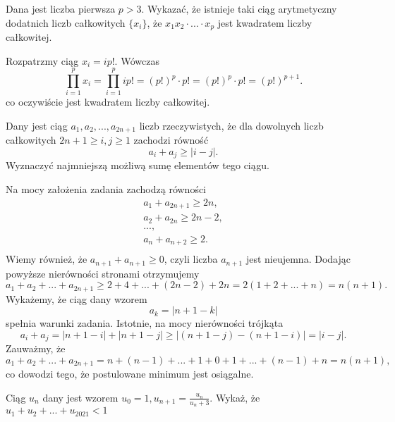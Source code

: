 \newpage
{}

\begin{problem}{1}
	Dana jest liczba pierwsza $p>3$. Wykazać, że istnieje taki ciąg arytmetyczny dodatnich liczb całkowitych $\{x_i\}$, że $x_1x_2\cdot ... \cdot x_p$ jest kwadratem liczby całkowitej.
\end{problem}

\noindent 
Rozpatrzmy ciąg $x_i=ip!$.
Wówczas
\[
	\prod_{i=1}^p x_i=\prod_{i=1}^p ip!=(p!)^{p}\cdot p! = (p!)^{p}\cdot p!=(p!)^{p+1}.
\]
co oczywiście jest kwadratem liczby całkowitej.
\\


\begin{problem}{2}
	Dany jest ciąg $a_1, a_2, ..., a_{2n + 1}$ liczb rzeczywistych, że dla dowolnych liczb całkowitych ${2n + 1 \geqslant i, j \geqslant 1}$ zachodzi równość
	\[
		a_i + a_j \geqslant |i - j|.
	\]
	Wyznaczyć najmniejszą możliwą sumę elementów tego ciągu.
\end{problem}


\noindent
Na mocy założenia zadania zachodzą równości
\begin{align*}
	a_1 + a_{2n + 1} \geqslant 2n, \\
	a_2 + a_{2n} \geqslant 2n - 2, \\
	..., \\
	a_n + a_{n + 2} \geqslant 2. \\
\end{align*}
Wiemy również, że $a_{n + 1} + a_{n + 1} \geqslant 0$, czyli liczba $a_{n + 1}$ jest nieujemna. Dodając powyższe nierówności stronami otrzymujemy
\[
	a_1 + a_2 + ... + a_{2n + 1} \geqslant 2 + 4 + ... + (2n - 2) + 2n = 2(1 + 2 + ... + n) = n(n + 1).
\]
Wykażemy, że ciąg dany wzorem
\[
	a_k = |n + 1 - k|
\]
spełnia warunki zadania. Istotnie, na mocy nierówności trójkąta
\[
	a_i + a_j = |n + 1 - i| + |n + 1 - j| \geqslant |(n + 1 - j) - (n + 1 - i)| = |i - j|.
\]
Zauważmy, że
\[
	a_1 + a_2 + ... + a_{2n + 1} = n + (n - 1) + ... + 1 + 0 + 1 + ... + (n - 1) + n = n(n + 1),
\]
co dowodzi tego, że postulowane minimum jest osiągalne.


\begin{problem}{3}
	Ciąg ${u_n}$ dany jest wzorem $u_0=1, u_{n+1}=\frac{u_n}{u_n+3}$. Wykaż, że $ u_1+u_2+...+u_{2021}<1$
\end{problem}

